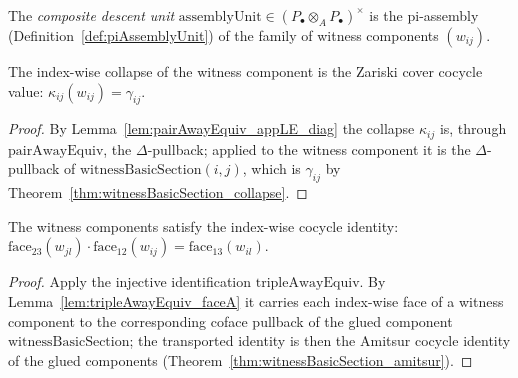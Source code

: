 \begin{definition}
  \label{def:assemblyUnit}
  \leanok
  The \emph{composite descent unit} \(\mathrm{assemblyUnit} \in (P_{\!\bullet} \otimes_A
  P_{\!\bullet})^{\times}\) is the pi-assembly (Definition~\ref{def:piAssemblyUnit}) of the
  family of witness components \((w_{ij})\).
\end{definition}

\begin{theorem}
  \label{thm:componentCollapse_witnessComponent}
  \leanok
  The index-wise collapse of the witness component is the Zariski cover cocycle value:
  \(\kappa_{ij}(w_{ij}) = \gamma_{ij}\).
\end{theorem}
\begin{proof}
  \leanok
  By Lemma~\ref{lem:pairAwayEquiv_appLE_diag} the collapse \(\kappa_{ij}\) is, through
  \(\mathrm{pairAwayEquiv}\), the \(\Delta\)-pullback; applied to the witness component it is the
  \(\Delta\)-pullback of \(\mathrm{witnessBasicSection}(i, j)\), which is \(\gamma_{ij}\) by
  Theorem~\ref{thm:witnessBasicSection_collapse}.
\end{proof}

\begin{theorem}
  \label{thm:faceA_cocycle_witnessComponent}
  \leanok
  The witness components satisfy the index-wise cocycle identity:
  \(\mathrm{face}_{23}(w_{jl}) \cdot \mathrm{face}_{12}(w_{ij}) = \mathrm{face}_{13}(w_{il})\).
\end{theorem}
\begin{proof}
  \leanok
  Apply the injective identification \(\mathrm{tripleAwayEquiv}\). By
  Lemma~\ref{lem:tripleAwayEquiv_faceA} it carries each index-wise face of a witness component
  to the corresponding coface pullback of the glued component
  \(\mathrm{witnessBasicSection}\); the transported identity is then the Amitsur cocycle
  identity of the glued components (Theorem~\ref{thm:witnessBasicSection_amitsur}).
\end{proof}

